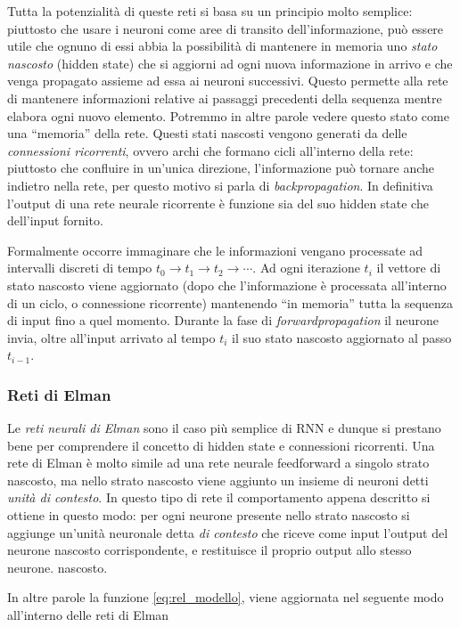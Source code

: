 \documentclass[12pt,a4paper,twoside,openright]{book}
\begin{document}
Tutta la potenzialità di queste reti si basa su un principio molto semplice: piuttosto che usare i neuroni come aree di transito dell'informazione, può essere utile che ognuno di essi abbia la possibilità di mantenere in memoria uno \emph{stato nascosto} (hidden state) che si aggiorni ad ogni nuova informazione in arrivo e che venga propagato assieme ad essa ai neuroni successivi. 
Questo permette alla rete di mantenere informazioni relative ai passaggi precedenti della sequenza mentre elabora ogni nuovo elemento. Potremmo in altre parole vedere questo stato come una ``memoria'' della rete.
Questi stati nascosti vengono generati da delle \emph{connessioni ricorrenti}, ovvero archi che formano cicli all'interno della rete: piuttosto che confluire in un'unica direzione, l'informazione può tornare anche indietro nella rete, per questo motivo si parla di \emph{backpropagation}.
In definitiva l'output di una rete neurale ricorrente è funzione sia del suo hidden state che dell'input fornito.

Formalmente occorre immaginare che le informazioni vengano processate ad intervalli discreti di tempo $t_0 \rightarrow t_1 \rightarrow t_2 \rightarrow \cdots$.
Ad ogni iterazione $t_i$ il vettore di stato nascosto viene aggiornato (dopo che l'informazione è processata all'interno di un ciclo, o connessione ricorrente) mantenendo ``in memoria'' tutta la sequenza di input fino a quel momento. Durante la fase di \emph{forwardpropagation} il neurone invia, oltre all'input arrivato al tempo $t_i$ il suo stato nascosto aggiornato al passo $t_{i-1}$. 

\subsubsection{Reti di Elman}
Le \emph{reti neurali di Elman} sono il caso più semplice di RNN e dunque si prestano bene per comprendere il concetto di hidden state e connessioni ricorrenti.
Una rete di Elman è molto simile ad una rete neurale feedforward a singolo strato nascosto, ma nello strato nascosto viene aggiunto un insieme di neuroni detti \emph{unità di contesto}.
In questo tipo di rete il comportamento appena descritto si ottiene in questo modo: per ogni neurone presente nello strato nascosto
si aggiunge un’unità neuronale detta \emph{di contesto} che riceve come input l’output del neurone nascosto corrispondente, e restituisce il proprio output allo stesso neurone.
nascosto.

In altre parole la funzione \ref{eq:rel_modello}, viene aggiornata nel seguente modo all'interno delle reti di Elman
\end{document}

